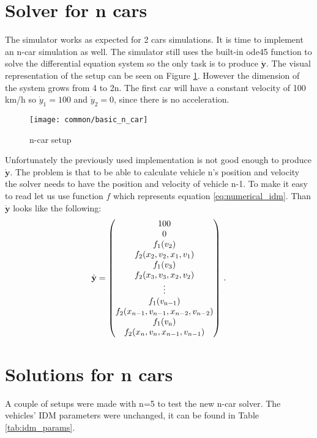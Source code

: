 	\section{Solver for n cars}
		The simulator works as expected for 2 cars simulations. It is time to implement an n-car simulation as well. The simulator still uses the built-in ode45 function to solve the differential equation system so the only task is to produce $\dot{\textbf{y}}$. The visual representation of the setup can be seen on Figure \ref{fig:basic_n_car}. However the dimension of the system grows from 4 to 2n. The first car will have a constant velocity of 100 km/h so $\dot{y}_1 = 100$ and $\dot{y}_2 = 0$, since there is no acceleration.
		\begin{figure}
			\centering
			\texttt{[image: common/basic\_n\_car]}
			\caption{n-car setup}
			\label{fig:basic_n_car}
		\end{figure}
		Unfortunately the previously used implementation is not good enough to produce $\dot{\textbf{y}}$. The problem is  that to be able to calculate vehicle n's position and velocity the solver needs to have the position and velocity of vehicle n-1. To make it easy to read let us use function $f$ which represents equation \ref{eq:numerical_idm}. Than $\dot{\textbf{y}}$ looks like the following:
		\begin{equation}
			\dot{\textbf{y}}=
			\begin{pmatrix}
				100\\
				0\\
				f_1(v_{2})\\
				f_2(x_{2}, v_{2},x_{1}, v_{1})\\
				f_1(v_{3})\\
				f_2(x_{3}, v_{3},x_{2}, v_{2})\\
				\vdots\\
				f_1(v_{\rm n-1})\\
				f_2(x_{n-1}, v_{n-1},x_{n-2}, v_{n-2})\\
				f_1(v_{\rm n})\\
				f_2(x_{n}, v_{n},x_{n-1}, v_{n-1})
			\end{pmatrix}\,.
			\label{eq:n_ode_math}
		\end{equation}
		\section{Solutions for n cars}
		A couple of setups were made with n=5 to test the new n-car solver. The vehicles' IDM parameters were unchanged, it can be found in Table \ref{tab:idm_params}.
